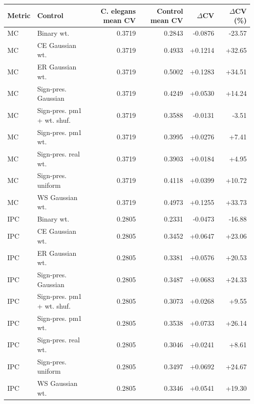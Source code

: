 \begin{tabular}{llrrrr}
\toprule
Metric & Control & C. elegans mean CV & Control mean CV & $\Delta$CV & $\Delta$CV (\%) \\
\midrule
MC & Binary wt. & 0.3719 & 0.2843 & -0.0876 & -23.57 \\
MC & CE Gaussian wt. & 0.3719 & 0.4933 & +0.1214 & +32.65 \\
MC & ER Gaussian wt. & 0.3719 & 0.5002 & +0.1283 & +34.51 \\
MC & Sign-pres. Gaussian & 0.3719 & 0.4249 & +0.0530 & +14.24 \\
MC & Sign-pres. pm1 + wt. shuf. & 0.3719 & 0.3588 & -0.0131 & -3.51 \\
MC & Sign-pres. pm1 wt. & 0.3719 & 0.3995 & +0.0276 & +7.41 \\
MC & Sign-pres. real wt. & 0.3719 & 0.3903 & +0.0184 & +4.95 \\
MC & Sign-pres. uniform & 0.3719 & 0.4118 & +0.0399 & +10.72 \\
MC & WS Gaussian wt. & 0.3719 & 0.4973 & +0.1255 & +33.73 \\
IPC & Binary wt. & 0.2805 & 0.2331 & -0.0473 & -16.88 \\
IPC & CE Gaussian wt. & 0.2805 & 0.3452 & +0.0647 & +23.06 \\
IPC & ER Gaussian wt. & 0.2805 & 0.3381 & +0.0576 & +20.53 \\
IPC & Sign-pres. Gaussian & 0.2805 & 0.3487 & +0.0683 & +24.33 \\
IPC & Sign-pres. pm1 + wt. shuf. & 0.2805 & 0.3073 & +0.0268 & +9.55 \\
IPC & Sign-pres. pm1 wt. & 0.2805 & 0.3538 & +0.0733 & +26.14 \\
IPC & Sign-pres. real wt. & 0.2805 & 0.3046 & +0.0241 & +8.61 \\
IPC & Sign-pres. uniform & 0.2805 & 0.3497 & +0.0692 & +24.67 \\
IPC & WS Gaussian wt. & 0.2805 & 0.3346 & +0.0541 & +19.30 \\
\bottomrule
\end{tabular}
